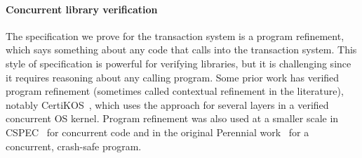 

\paragraph{Concurrent library verification}

The specification we prove for the transaction system is a program refinement,
which says something about any code that calls into the transaction system. This
style of specification is powerful for verifying libraries, but it is
challenging since it requires reasoning about any calling program. Some prior
work has verified program refinement (sometimes called contextual refinement in
the literature), notably CertiKOS~\cite{gu:certikos-ccal}, which uses the
approach for several layers in a verified concurrent OS kernel. Program
refinement was also used at a smaller scale in CSPEC~\cite{chajed:cspec} for
concurrent code and in the original Perennial work~\cite{chajed:perennial} for a
concurrent, crash-safe program.



%


